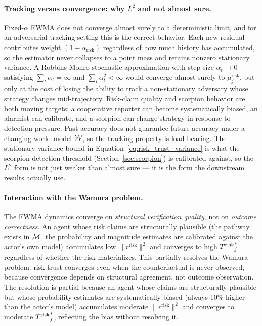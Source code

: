\paragraph{Tracking versus convergence: why $L^2$ and not almost sure.}
Fixed-$\alpha$ EWMA does not converge almost surely to a deterministic
limit, and for an adversarial-tracking setting this is the correct
behavior. Each new residual contributes weight $(1 - \alpha_{\mathrm{risk}})$
regardless of how much history has accumulated, so the estimator
never collapses to a point mass and retains nonzero stationary
variance. A Robbins-Monro stochastic approximation with step size
$\alpha_t \to 0$ satisfying $\sum_t \alpha_t = \infty$ and
$\sum_t \alpha_t^2 < \infty$ \citep{robbins1951stochastic} would
converge almost surely to $\mu_j^{\mathrm{risk}}$, but only at the
cost of losing the ability to track a non-stationary adversary whose
strategy changes mid-trajectory. Risk-claim quality and scorpion
behavior are both moving targets: a cooperative reporter can become
systematically biased, an alarmist can calibrate, and a scorpion can
change strategy in response to detection pressure. Past accuracy does
not guarantee future accuracy under a changing world model
$\mathcal{W}$, so the tracking property is load-bearing. The
stationary-variance bound in Equation~\eqref{eq:risk_trust_variance}
is what the scorpion detection threshold
(Section~\ref{sec:scorpion}) is calibrated against, so the $L^2$
form is not just weaker than almost sure --- it is the form the
downstream results actually use.

\paragraph{Interaction with the Wamura problem.} The EWMA dynamics converge
on \emph{structural verification quality}, not on \emph{outcome correctness}.
An agent whose risk claims are structurally plausible (the pathway exists in
$\mathcal{M}$, the probability and magnitude estimates are calibrated against the
actor's own model) accumulates low $\|r^{\mathrm{risk}}\|^2$ and converges
to high ${T^{\mathrm{risk}}}_j^*$ regardless of whether the risk materializes. This
partially resolves the Wamura problem: risk-trust converges even when the
counterfactual is never observed, because convergence depends on structural
agreement, not outcome observation. The resolution is partial because an
agent whose claims are structurally plausible but whose probability estimates
are systematically biased (always 10\% higher than the actor's model)
accumulates moderate $\|r^{\mathrm{risk}}\|^2$ and converges to moderate
${T^{\mathrm{risk}}}_j^*$, reflecting the bias without resolving it.

